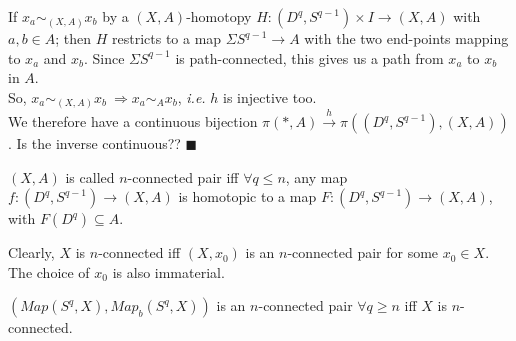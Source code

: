 \documentclass[11pt]{article}
\numberwithin{equation}{section}
\begin{document}
If $x_a\sim_{(X,A)}x_b$ by a $(X,A)$-homotopy $H:(D^q,S^{q-1})\times I\rightarrow (X,A)$ with $a,b\in A$; then $H$ restricts to a map $\Sigma S^{q-1}\rightarrow A$ with the two end-points mapping to $x_a$ and $x_b$. Since $\Sigma S^{q-1}$ is path-connected, this gives us a path from $x_a$ to $x_b$ in $A$. \\ So, $x_a\sim_{(X,A)}x_b\ \Rightarrow x_a\sim_{A}x_b$, \emph{i.e.} $h$ is injective too. \\ 
We therefore have a continuous bijection $\pi(*,A)\xrightarrow{h}\pi((D^q,S^{q-1}),(X,A))$. Is the inverse continuous?? $\blacksquare$
\begin{defn}
     $(X,A)$ is called $n$-connected pair iff $\forall q\leqslant n$, any map $f:(D^q,S^{q-1})\rightarrow (X,A)$ is homotopic to a map $F:(D^q,S^{q-1})\rightarrow (X,A)$, with $F(D^q)\subseteq A$. 
\end{defn}
\begin{rem}
     Clearly, $X$ is $n$-connected iff $(X,x_0)$ is an $n$-connected pair for some $x_0\in X$. The choice of $x_0$ is also immaterial.
\end{rem}
\begin{rem}
     $(Map(S^q,X),Map_b(S^q,X))$ is an $n$-connected pair $\forall q\geqslant n$ iff $X$ is $n$-connected.
\end{rem}
\end{document}
